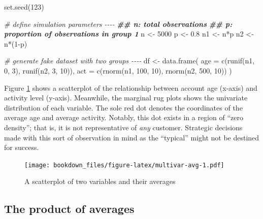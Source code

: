 \documentclass[
]{krantz}
\makeatletter
\newenvironment{Shaded}{\begin{snugshade}}{\end{snugshade}}
\newcommand{\AttributeTok}[1]{\textcolor[rgb]{0.61,0.61,0.61}{#1}}
\newcommand{\CommentTok}[1]{\textcolor[rgb]{0.37,0.37,0.37}{\textit{#1}}}
\newcommand{\DecValTok}[1]{\textcolor[rgb]{0.06,0.06,0.06}{#1}}
\newcommand{\DocumentationTok}[1]{\textcolor[rgb]{0.37,0.37,0.37}{\textbf{\textit{#1}}}}
\newcommand{\FloatTok}[1]{\textcolor[rgb]{0.06,0.06,0.06}{#1}}
\newcommand{\FunctionTok}[1]{\textcolor[rgb]{0,0,0}{#1}}
\newcommand{\NormalTok}[1]{#1}
\newcommand{\OtherTok}[1]{\textcolor[rgb]{0.37,0.37,0.37}{#1}}
\newcommand{\SpecialCharTok}[1]{\textcolor[rgb]{0,0,0}{#1}}
\newenvironment{kframe}{%
\medskip{}
\setlength{\fboxsep}{.8em}
 \def\at@end@of@kframe{}%
 \ifinner\ifhmode%
  \def\at@end@of@kframe{\end{minipage}}%
  \begin{minipage}{\columnwidth}%
 \fi\fi%
 \def\FrameCommand##1{\hskip\@totalleftmargin \hskip-\fboxsep
 \colorbox{shadecolor}{##1}\hskip-\fboxsep
     \hskip-\linewidth \hskip-\@totalleftmargin \hskip\columnwidth}%
 \MakeFramed {\advance\hsize-\width
   \@totalleftmargin\z@ \linewidth\hsize
   \@setminipage}}%
 {\par\unskip\endMakeFramed%
 \at@end@of@kframe}
\renewenvironment{Shaded}{\begin{kframe}}{\end{kframe}}
\makeatother
\begin{document}
\begin{Shaded}
\begin{Highlighting}[]
\FunctionTok{set.seed}\NormalTok{(}\DecValTok{123}\NormalTok{)}

\CommentTok{\# define simulation parameters {-}{-}{-}{-}}
\DocumentationTok{\#\# n: total observations}
\DocumentationTok{\#\# p: proportion of observations in group 1}
\NormalTok{n }\OtherTok{\textless{}{-}} \DecValTok{5000}
\NormalTok{p }\OtherTok{\textless{}{-}} \FloatTok{0.8}
\NormalTok{n1 }\OtherTok{\textless{}{-}}\NormalTok{ n}\SpecialCharTok{*}\NormalTok{p}
\NormalTok{n2 }\OtherTok{\textless{}{-}}\NormalTok{ n}\SpecialCharTok{*}\NormalTok{(}\DecValTok{1}\SpecialCharTok{{-}}\NormalTok{p)}

\CommentTok{\# generate fake dataset with two groups {-}{-}{-}{-}}
\NormalTok{df }\OtherTok{\textless{}{-}} 
  \FunctionTok{data.frame}\NormalTok{(}
    \AttributeTok{age =} \FunctionTok{c}\NormalTok{(}\FunctionTok{runif}\NormalTok{(n1,   }\DecValTok{0}\NormalTok{,  }\DecValTok{3}\NormalTok{), }\FunctionTok{runif}\NormalTok{(n2,   }\DecValTok{3}\NormalTok{, }\DecValTok{10}\NormalTok{)),}
    \AttributeTok{act =} \FunctionTok{c}\NormalTok{(}\FunctionTok{rnorm}\NormalTok{(n1, }\DecValTok{100}\NormalTok{, }\DecValTok{10}\NormalTok{), }\FunctionTok{rnorm}\NormalTok{(n2, }\DecValTok{500}\NormalTok{, }\DecValTok{10}\NormalTok{))}
\NormalTok{  )}
\end{Highlighting}
\end{Shaded}

Figure \ref{fig:multivar-avg} shows a scatterplot of the relationship between account age (x-axis) and activity level (y-axis).
Meanwhile, the marginal rug plots shows the univariate distribution of each variable.
The sole red dot denotes the coordinates of the average age and average activity.
Notably, this dot exists in a region of ``zero density'';
that is, it is not representative of \emph{any} customer.
Strategic decisions made with this sort of observation in mind as the ``typical'' might not be destined for success.

\begin{figure}
\centering
\texttt{[image: bookdown\_files/figure-latex/multivar-avg-1.pdf]}
\caption{\label{fig:multivar-avg}A scatterplot of two variables and their averages}
\end{figure}

\hypertarget{the-product-of-averages}{%
\subsection{The product of averages}\label{the-product-of-averages}}
\end{document}
